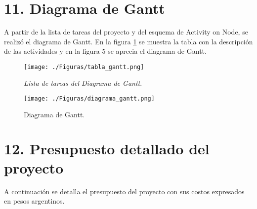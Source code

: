\documentclass[
11pt, %
]{charter}
\begin{document}
\section{11. Diagrama de Gantt}
\label{sec:gantt}

A partir de la lista de tareas del proyecto y del esquema de Activity on Node, se realizó el
diagrama de Gantt. En la figura \ref{fig:tablaGantt} se muestra la tabla con la descripción de las actividades y en la figura 5 
se aprecia el diagrama de Gantt. 

\begin{figure}[htpb]
  \centering 
  \texttt{[image: ./Figuras/tabla\_gantt.png]}
  \caption{\textit{Lista de tareas del Diagrama de Gantt}.}
  \label{fig:tablaGantt}
\end{figure}
\pagebreak

\begin{landscape}
    \begin{figure}[htpb]
    \centering 
    \texttt{[image: ./Figuras/diagrama\_gantt.png]}
    \caption{Diagrama de Gantt.} 
    \label{fig:diagGantt}
    \end{figure}
    
\end{landscape}
    

\section{12. Presupuesto detallado del proyecto}
\label{sec:presupuesto}

A continuación se detalla el presupuesto del proyecto con sus costos expresados en pesos argentinos.
\end{document}
